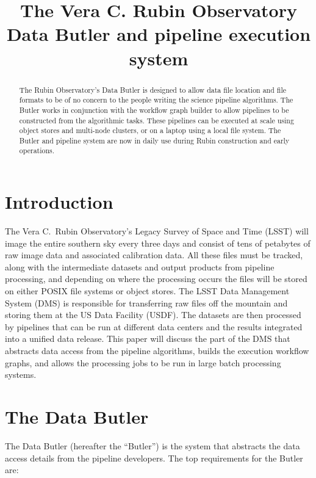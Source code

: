 \documentclass[]{spie}
\title{The Vera C. Rubin Observatory Data Butler and pipeline execution system}
\begin{document}
\maketitle

\begin{abstract}
    The Rubin Observatory's Data Butler is designed to allow data file location and file formats to be of no concern to the people writing the science pipeline algorithms.
    The Butler works in conjunction with the workflow graph builder to allow pipelines to be constructed from the algorithmic tasks.
    These pipelines can be executed at scale using object stores and multi-node clusters, or on a laptop using a local file system.
    The Butler and pipeline system are now in daily use during Rubin construction and early operations.
\end{abstract}


\section{Introduction}

The Vera C.\ Rubin Observatory's Legacy Survey of Space and Time (LSST) \cite{2019ApJ...873..111I} will image the entire southern sky every three days and consist of tens of petabytes of raw image data and associated calibration data.
All these files must be tracked, along with the intermediate datasets and output products from pipeline processing, and depending on where the processing occurs the files will be stored on either POSIX file systems or object stores.
The LSST Data Management System (DMS)\cite{2017ASPC..512..279J} is responsible for transferring raw files off the mountain and storing them at the US Data Facility (USDF).
The datasets are then processed by pipelines\cite{2019ASPC..523..521B,2018PASJ...70S...5B} that can be run at different data centers and the results integrated into a unified data release.
This paper will discuss the part of the DMS that abstracts data access from the pipeline algorithms, builds the execution workflow graphs, and allows the processing jobs to be run in large batch processing systems.

\section{The Data Butler}

The Data Butler (hereafter the ``Butler'') is the system that abstracts the data access details from the pipeline developers.
The top requirements for the Butler are:
\end{document}
